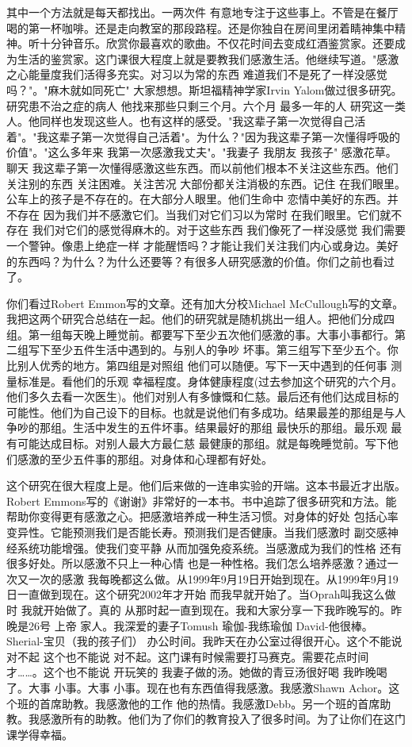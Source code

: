 其中一个方法就是每天都找出。一两次件 有意地专注于这些事上。不管是在餐厅喝的第一杯咖啡。还是走向教室的那段路程。还是你独自在房间里闭着睛神集中精神。听十分钟音乐。欣赏你最喜欢的歌曲。不仅花时间去变成红酒鉴赏家。还要成为生活的鉴赏家。这门课很大程度上就是要教我们感激生活。他继续写道。"感激之心能量度我们活得多充实。对习以为常的东西 难道我们不是死了一样没感觉吗？"。"麻木就如同死亡" 大家想想。斯坦福精神学家Irvin Yalom做过很多研究。研究患不治之症的病人 他找来那些只剩三个月。六个月 最多一年的人 研究这一类人。他同样也发现这些人。也有这样的感受。"我这辈子第一次觉得自己活着"。"我这辈子第一次觉得自己活着"。为什么？"因为我这辈子第一次懂得呼吸的价值"。"这么多年来 我第一次感激我丈夫"。"我妻子 我朋友 我孩子" 感激花草。聊天 我这辈子第一次懂得感激这些东西。而以前他们根本不关注这些东西。他们关注别的东西 关注困难。关注苦况 大部份都关注消极的东西。记住 在我们眼里。公车上的孩子是不存在的。在大部分人眼里。他们生命中 恋情中美好的东西。并不存在 因为我们并不感激它们。当我们对它们习以为常时 在我们眼里。它们就不存在 我们对它们的感觉得麻木的。对于这些东西 我们像死了一样没感觉 我们需要一个警钟。像患上绝症一样 才能醒悟吗？才能让我们关注我们内心或身边。美好的东西吗？为什么？为什么还要等？有很多人研究感激的价值。你们之前也看过了。 

你们看过Robert Emmon写的文章。还有加大分校Michael McCullough写的文章。我把这两个研究合总结在一起。他们的研究就是随机挑出一组人。把他们分成四组。第一组每天晚上睡觉前。都要写下至少五次他们感激的事。大事小事都行。第二组写下至少五件生活中遇到的。与别人的争吵 坏事。第三组写下至少五个。你比别人优秀的地方。第四组是对照组 他们可以随便。写下一天中遇到的任何事 测量标准是。看他们的乐观 幸福程度。身体健康程度(过去参加这个研究的六个月。他们多久去看一次医生)。他们对别人有多慷慨和仁慈。最后还有他们达成目标的可能性。他们为自己设下的目标。也就是说他们有多成功。结果最差的那组是与人争吵的那组。生活中发生的五件坏事。结果最好的那组 最快乐的那组。最乐观 最有可能达成目标。对别人最大方最仁慈 最健康的那组。就是每晚睡觉前。写下他们感激的至少五件事的那组。对身体和心理都有好处。 

这个研究在很大程度上是。他们后来做的一连串实验的开端。这本书最近才出版。Robert Emmons写的《谢谢》非常好的一本书。书中追踪了很多研究和方法。能帮助你变得更有感激之心。把感激培养成一种生活习惯。对身体的好处 包括心率变异性。它能预测我们是否能长寿。预测我们是否健康。当我们感激时 副交感神经系统功能增强。使我们变平静 从而加强免疫系统。当感激成为我们的性格 还有很多好处。所以感激不只上一种心情 也是一种性格。我们怎么培养感激？通过一次又一次的感激 我每晚都这么做。从1999年9月19日开始到现在。从1999年9月19日一直做到现在。这个研究2002年才开始 而我早就开始了。当Oprah叫我这么做时 我就开始做了。真的 从那时起一直到现在。我和大家分享一下我昨晚写的。昨晚是26号 上帝 家人。我深爱的妻子Tomush 瑜伽-我练瑜伽 David-他很棒。Sherial-宝贝（我的孩子们） 办公时间。我昨天在办公室过得很开心。这个不能说 对不起 这个也不能说 对不起。这门课有时候需要打马赛克。需要花点时间才……。这个也不能说 开玩笑的 我妻子做的汤。她做的青豆汤很好喝 我昨晚喝了。大事 小事。大事 小事。现在也有东西值得我感激。我感激Shawn Achor。这个班的首席助教。我感激他的工作 他的热情。我感激Debb。另一个班的首席助教。我感激所有的助教。他们为了你们的教育投入了很多时间。为了让你们在这门课学得幸福。 

